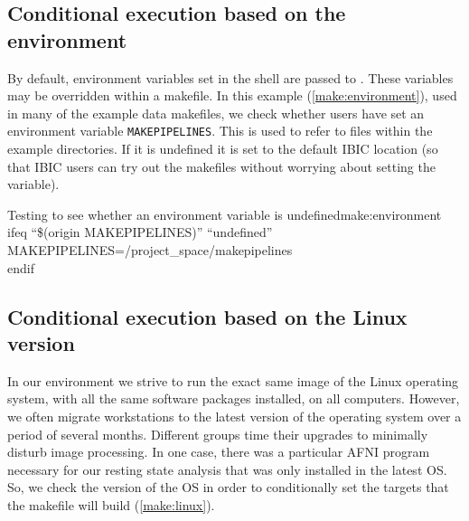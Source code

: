 \subsection{Conditional execution based on the environment}
By default, environment variables set in the shell are passed to \maken{}. These variables may be overridden within a makefile. In this example (\autoref{make:environment}), used in many of the example data makefiles, we check whether users have set an environment variable \texttt{MAKEPIPELINES}. This is used to refer to files within the example directories.  If it is undefined it is set to the default IBIC location (so that IBIC users can try out the makefiles without worrying about setting the variable).

\begin{make}{Testing to see whether an environment variable is undefined}{make:environment}
ifeq ``\$(origin MAKEPIPELINES)'' ``undefined'' \\
MAKEPIPELINES=/project_space/makepipelines \\
endif
\end{make}


\subsection{Conditional execution based on the Linux version}

In our environment we strive to run the exact same image of the Linux operating system, with all the same software packages installed, on all computers. However, we often migrate workstations to the latest version of the operating system over a period of several months. Different groups time their upgrades to minimally disturb image processing. In one case, there was a particular AFNI program necessary for our resting state analysis that was only installed in the latest OS. So, we check the version of the OS in order to conditionally set the targets that the makefile will build (\autoref{make:linux}).

%

